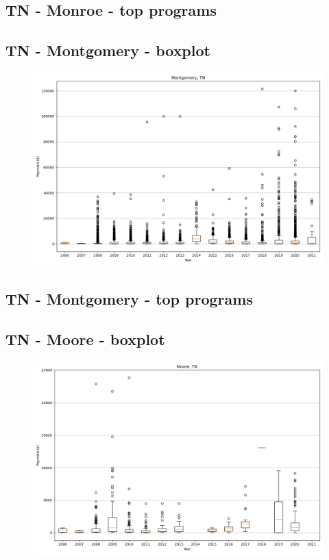 \subsection*{TN - Monroe - top programs}

\newpage
\subsection*{TN - Montgomery - boxplot}
\begin{figure}[h]
\centering
\includegraphics[width=7in]{../output/boxplots/counties/Montgomery-TN_boxplot.png}
\end{figure}


\subsection*{TN - Montgomery - top programs}

\newpage
\subsection*{TN - Moore - boxplot}
\begin{figure}[h]
\centering
\includegraphics[width=7in]{../output/boxplots/counties/Moore-TN_boxplot.png}
\end{figure}


